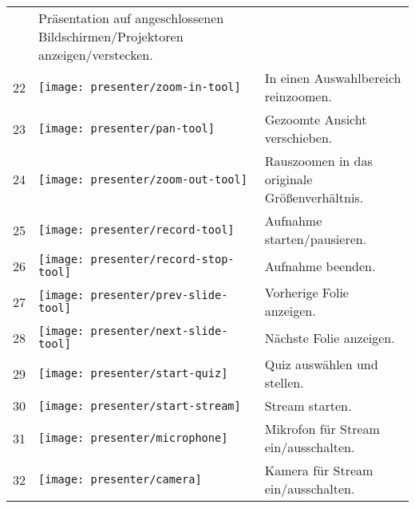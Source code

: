\begin{longtable}{lp{1cm}p{12cm}}
\begin{minipage}{.06\textwidth}
	\end{minipage}
	& Präsentation auf angeschlossenen Bildschirmen/Projektoren anzeigen/verstecken. \\
	22 &
	\begin{minipage}{.06\textwidth}
		\texttt{[image: presenter/zoom-in-tool]}
	\end{minipage}
	& In einen Auswahlbereich reinzoomen. \\
	23 &
	\begin{minipage}{.06\textwidth}
		\texttt{[image: presenter/pan-tool]}
	\end{minipage}
	& Gezoomte Ansicht verschieben. \\
	24 &
	\begin{minipage}{.06\textwidth}
		\texttt{[image: presenter/zoom-out-tool]}
	\end{minipage}
	& Rauszoomen in das originale Größenverhältnis. \\
	25 &
	\begin{minipage}{.06\textwidth}
		\texttt{[image: presenter/record-tool]}
	\end{minipage}
	& Aufnahme starten/pausieren. \\
	26 &
	\begin{minipage}{.06\textwidth}
		\texttt{[image: presenter/record-stop-tool]}
	\end{minipage}
	& Aufnahme beenden. \\
	27 &
	\begin{minipage}{.06\textwidth}
		\texttt{[image: presenter/prev-slide-tool]}
	\end{minipage}
	& Vorherige Folie anzeigen. \\
	28 &
	\begin{minipage}{.06\textwidth}
		\texttt{[image: presenter/next-slide-tool]}
	\end{minipage}
	& Nächste Folie anzeigen. \\
	29 &
	\begin{minipage}{.06\textwidth}
		\texttt{[image: presenter/start-quiz]}
	\end{minipage}
	& Quiz auswählen und stellen. \\
	30 &
	\begin{minipage}{.06\textwidth}
		\texttt{[image: presenter/start-stream]}
	\end{minipage}
	& Stream starten. \\
	31 &
	\begin{minipage}{.06\textwidth}
		\texttt{[image: presenter/microphone]}
	\end{minipage}
	& Mikrofon für Stream ein/ausschalten. \\
	32 &
	\begin{minipage}{.06\textwidth}
		\texttt{[image: presenter/camera]}
	\end{minipage}
	& Kamera für Stream ein/ausschalten. \\
\end{longtable}

